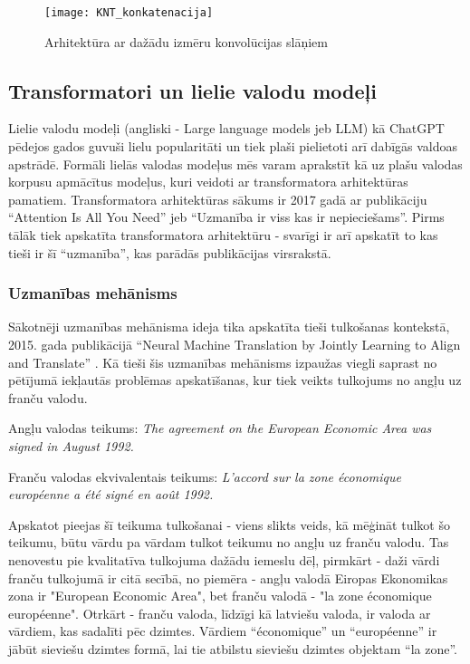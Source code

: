 \begin{figure}[H]
	\texttt{[image: KNT\_konkatenacija]}
	\caption{Arhitektūra ar dažādu izmēru konvolūcijas slāņiem \cite{TextCNNLena}}
	\label{fig:KNT_konkatenacija}
\end{figure}

\subsection{Transformatori un lielie valodu modeļi}
Lielie valodu modeļi (angliski - Large language models jeb LLM) kā ChatGPT pēdejos gados guvuši lielu popularitāti un tiek plaši pielietoti arī dabīgās valdoas apstrādē. Formāli lielās valodas modeļus mēs varam aprakstīt kā uz plašu valodas korpusu apmācītus modeļus, kuri veidoti ar transformatora arhitektūras pamatiem. Transformatora arhitektūras sākums ir 2017 gadā ar publikāciju “Attention Is All You Need” \cite{vaswani2023attention} jeb “Uzmanība ir viss kas ir nepieciešams”. Pirms tālāk tiek apskatīta transformatora arhitektūru - svarīgi ir arī apskatīt to kas tieši ir šī “uzmanība”, kas parādās publikācijas virsrakstā.

\subsubsection{Uzmanības mehānisms}
Sākotnēji uzmanības mehānisma ideja tika apskatīta tieši tulkošanas kontekstā, 2015. gada publikācijā “Neural Machine Translation by Jointly Learning to Align and Translate” \cite{bahdanau2016neural}. Kā tieši šis uzmanības mehānisms izpaužas viegli saprast no pētījumā iekļautās problēmas apskatīšanas, kur tiek veikts tulkojums no angļu uz franču valodu.


\noindent Angļu valodas teikums: \textit{The agreement on the European Economic Area was signed in August 1992.}


\noindent Franču valodas ekvivalentais teikums: \textit{L’accord sur la zone économique européenne a été signé en août 1992.}

Apskatot pieejas šī teikuma tulkošanai - viens slikts veids, kā mēģināt tulkot šo teikumu, būtu vārdu pa vārdam tulkot teikumu no angļu uz franču valodu. Tas nenovestu pie kvalitatīva tulkojuma dažādu iemeslu dēļ, pirmkārt - daži vārdi franču tulkojumā ir citā secībā, no piemēra - angļu valodā Eiropas Ekonomikas zona ir "European Economic Area", bet franču valodā - "la zone économique européenne". Otrkārt - franču valoda, līdzīgi kā latviešu valoda, ir valoda ar vārdiem, kas sadalīti pēc dzimtes. Vārdiem “économique” un “européenne” ir jābūt sieviešu dzimtes formā, lai tie atbilstu sieviešu dzimtes objektam “la zone”.

